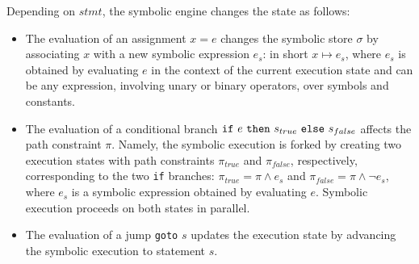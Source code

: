 \noindent Depending on $stmt$, the symbolic engine changes the state as follows:
\begin{itemize}
  \item The evaluation of an assignment $x=e$ changes the symbolic store $\sigma$ by associating $x$ with a new symbolic expression $e_s$: in short $x\mapsto e_s$, where $e_s$ is obtained by evaluating $e$ in the context of the current execution state and  can be any expression, involving unary or binary operators, over symbols and constants.
  

  \item The evaluation of a conditional branch ${\tt if}~e~{\tt then}~s_{true}~{\tt else}~s_{false}$ affects the path constraint $\pi$. Namely, the symbolic execution is forked by creating two execution states with path constraints $\pi_{true}$ and $\pi_{false}$, respectively, corresponding to the two {\tt if} branches: $\pi_{true}=\pi \wedge e_s$ and $\pi_{false}=\pi \wedge \neg e_s$, where $e_s$ is a symbolic expression obtained by evaluating $e$. 
    Symbolic execution proceeds on both states in parallel.

  \item The evaluation of a jump {\tt goto} $s$ updates the execution state by advancing the symbolic execution to statement $s$. 
\end{itemize}



